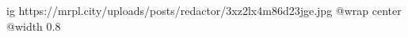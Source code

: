  
 
 
 
 

\ifcmt
  ig https://mrpl.city/uploads/posts/redactor/3xz2lx4m86d23jge.jpg
  @wrap center
  @width 0.8
\fi
